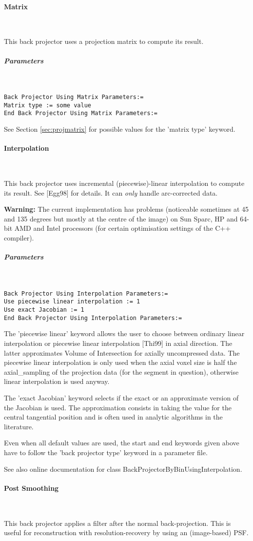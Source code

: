 \documentclass{article}
\newcommand{\subsubsubsection}[1]{\paragraph{#1}\mbox{} \\}
\newcommand{\subsubsubsubsection}[1]{\subparagraph{#1} \mbox{} \\}
\begin{document}
{{ \subsubsubsection{Matrix}
}
This back projector uses a projection matrix to compute its result.

{ \subsubsubsubsection{Parameters}
}
\begin{verbatim}
Back Projector Using Matrix Parameters:=
Matrix type := some value
End Back Projector Using Matrix Parameters:=
\end{verbatim}

See Section \ref{sec:projmatrix} for possible values for the 'matrix type' keyword.

{ \subsubsubsection{Interpolation}
}
\label{sec:IncrementalInterpolationBackProjector}
This back projector uses incremental (piecewise)-linear interpolation 
to compute its result. See [Egg98] for details. It can \textit{only} handle arc-corrected data.


\textbf{Warning:} The current implementation has problems (noticeable 
sometimes at 45 and 135 degrees but mostly at the centre of the image) on Sun 
Sparc, HP and 64-bit AMD and Intel processors (for certain optimisation settings
of the C++ compiler).

{ \subsubsubsubsection{Parameters}
}
\begin{verbatim}
Back Projector Using Interpolation Parameters:=
Use piecewise linear interpolation := 1
Use exact Jacobian := 1
End Back Projector Using Interpolation Parameters:=
\end{verbatim}

The 'piecewise linear' keyword allows the user to choose between 
ordinary linear interpolation or piecewise linear interpolation 
[Thi99] in axial direction. The latter approximates Volume of 
Intersection for axially uncompressed data. The piecewise linear 
interpolation is only used when the axial voxel size is half 
the axial\_sampling of the projection data (for the segment in 
question), otherwise linear interpolation is used anyway.


The 'exact Jacobian' keyword selects if the exact or an approximate 
version of the Jacobian is used. The approximation consists in 
taking the value for the central tangential position and is often 
used in analytic algorithms in the literature.


Even when all default values are used, the start and end keywords 
given above have to follow the 'back projector type' keyword 
in a parameter file.


See also online documentation for class BackProjectorByBinUsingInterpolation.

{ \subsubsubsection{Post Smoothing}
}
This back projector applies a filter after the normal back-projection.
This is useful for reconstruction with resolution-recovery 
by using an (image-based) PSF.

}
\end{document}
